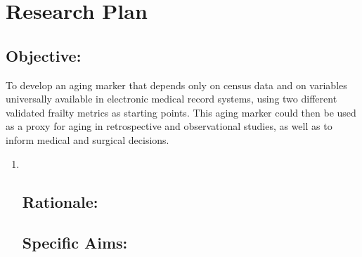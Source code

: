 \section{Research Plan }\label{research-plan}


\subsection{Objective:}\label{objective}
  


To develop an aging marker that depends only on census data and on
variables universally available in electronic medical record systems,
using two different validated frailty metrics as starting points. This
aging marker could then be used as a proxy for aging in retrospective
and observational studies, as well as to inform medical and surgical
decisions.

\begin{enumerate}
\item ~

\subsection{Rationale:}\label{rationale}

\subsection{Specific Aims:}\label{specific-aims}

\end{enumerate}